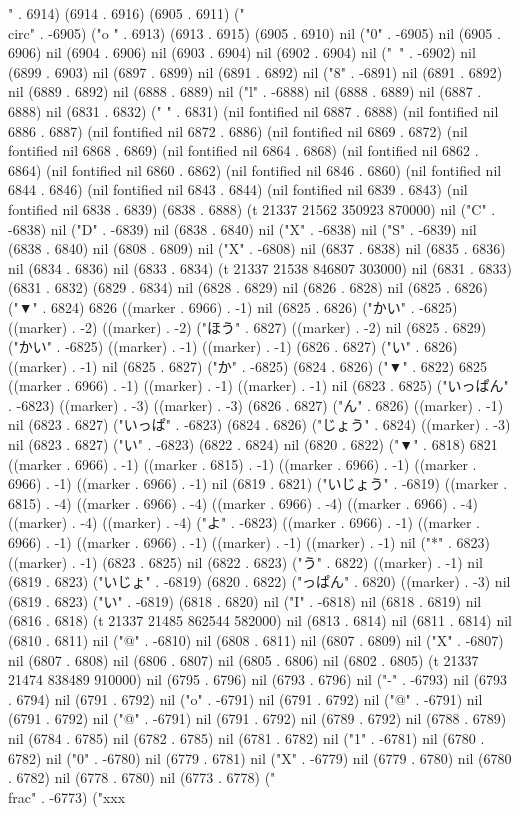 {{" . 6914) (6914 . 6916) (6905 . 6911) ("\\circ" . -6905) ("o
" . 6913) (6913 . 6915) (6905 . 6910) nil ("0" . -6905) nil (6905 . 6906) nil (6904 . 6906) nil (6903 . 6904) nil (6902 . 6904) nil ("~" . -6902) nil (6899 . 6903) nil (6897 . 6899) nil (6891 . 6892) nil ("8" . -6891) nil (6891 . 6892) nil (6889 . 6892) nil (6888 . 6889) nil ("l" . -6888) nil (6888 . 6889) nil (6887 . 6888) nil (6831 . 6832) ("  " . 6831) (nil fontified nil 6887 . 6888) (nil fontified nil 6886 . 6887) (nil fontified nil 6872 . 6886) (nil fontified nil 6869 . 6872) (nil fontified nil 6868 . 6869) (nil fontified nil 6864 . 6868) (nil fontified nil 6862 . 6864) (nil fontified nil 6860 . 6862) (nil fontified nil 6846 . 6860) (nil fontified nil 6844 . 6846) (nil fontified nil 6843 . 6844) (nil fontified nil 6839 . 6843) (nil fontified nil 6838 . 6839) (6838 . 6888) (t 21337 21562 350923 870000) nil ("C" . -6838) nil ("D" . -6839) nil (6838 . 6840) nil ("X" . -6838) nil ("S" . -6839) nil (6838 . 6840) nil (6808 . 6809) nil ("X" . -6808) nil (6837 . 6838) nil (6835 . 6836) nil (6834 . 6836) nil (6833 . 6834) (t 21337 21538 846807 303000) nil (6831 . 6833) (6831 . 6832) (6829 . 6834) nil (6828 . 6829) nil (6826 . 6828) nil (6825 . 6826) ("▼" . 6824) 6826 ((marker . 6966) . -1) nil (6825 . 6826) ("かい" . -6825) ((marker) . -2) ((marker) . -2) ("ほう" . 6827) ((marker) . -2) nil (6825 . 6829) ("かい" . -6825) ((marker) . -1) ((marker) . -1) (6826 . 6827) ("い" . 6826) ((marker) . -1) nil (6825 . 6827) ("か" . -6825) (6824 . 6826) ("▼" . 6822) 6825 ((marker . 6966) . -1) ((marker) . -1) ((marker) . -1) nil (6823 . 6825) ("いっぱん" . -6823) ((marker) . -3) ((marker) . -3) (6826 . 6827) ("ん" . 6826) ((marker) . -1) nil (6823 . 6827) ("いっぱ" . -6823) (6824 . 6826) ("じょう" . 6824) ((marker) . -3) nil (6823 . 6827) ("い" . -6823) (6822 . 6824) nil (6820 . 6822) ("▼" . 6818) 6821 ((marker . 6966) . -1) ((marker . 6815) . -1) ((marker . 6966) . -1) ((marker . 6966) . -1) ((marker . 6966) . -1) nil (6819 . 6821) ("いじょう" . -6819) ((marker . 6815) . -4) ((marker . 6966) . -4) ((marker . 6966) . -4) ((marker . 6966) . -4) ((marker) . -4) ((marker) . -4) ("よ" . -6823) ((marker . 6966) . -1) ((marker . 6966) . -1) ((marker . 6966) . -1) ((marker) . -1) ((marker) . -1) nil ("*" . 6823) ((marker) . -1) (6823 . 6825) nil (6822 . 6823) ("う" . 6822) ((marker) . -1) nil (6819 . 6823) ("いじょ" . -6819) (6820 . 6822) ("っぱん" . 6820) ((marker) . -3) nil (6819 . 6823) ("い" . -6819) (6818 . 6820) nil ("I" . -6818) nil (6818 . 6819) nil (6816 . 6818) (t 21337 21485 862544 582000) nil (6813 . 6814) nil (6811 . 6814) nil (6810 . 6811) nil ("@" . -6810) nil (6808 . 6811) nil (6807 . 6809) nil ("X" . -6807) nil (6807 . 6808) nil (6806 . 6807) nil (6805 . 6806) nil (6802 . 6805) (t 21337 21474 838489 910000) nil (6795 . 6796) nil (6793 . 6796) nil ("-" . -6793) nil (6793 . 6794) nil (6791 . 6792) nil ("o" . -6791) nil (6791 . 6792) nil ("@" . -6791) nil (6791 . 6792) nil ("@" . -6791) nil (6791 . 6792) nil (6789 . 6792) nil (6788 . 6789) nil (6784 . 6785) nil (6782 . 6785) nil (6781 . 6782) nil ("1" . -6781) nil (6780 . 6782) nil ("0" . -6780) nil (6779 . 6781) nil ("X" . -6779) nil (6779 . 6780) nil (6780 . 6782) nil (6778 . 6780) nil (6773 . 6778) ("\\frac" . -6773) ("xxx
}}
